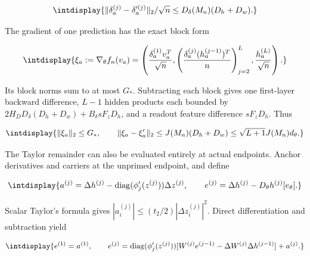\begingroup\renewcommand{\theHequation}{intdisplay.455}
\begin{equation*}
\intdisplay{
\|\delta_a^{(j)}-\delta_a'^{(j)}\|_2/\sqrt n
\le D_\delta(M_n)(D_h+D_w).
}
\end{equation*}
\endgroup


The gradient of one prediction has the exact block form


\begingroup\renewcommand{\theHequation}{intdisplay.456}
\begin{equation*}
\intdisplay{
\xi_a:=\nabla_\theta f_n(v_a)=
\left(\frac{\delta_a^{(1)}v_a^T}{\sqrt n},
\left(\frac{\delta_a^{(j)}(h_a^{(j-1)})^T}{n}\right)_{j=2}^L,
\frac{h_a^{(L)}}{\sqrt n}\right).
}
\end{equation*}
\endgroup


Its block norms sum to at most \(G_*\). Subtracting each block gives one first-layer backward difference, \(L-1\) hidden products each bounded by \(2H_DD_\delta(D_h+D_w)+B_\delta sF_zD_h\), and a readout feature difference \(sF_zD_h\). Thus


\begingroup\renewcommand{\theHequation}{intdisplay.457}
\begin{equation*}
\intdisplay{
\|\xi_a\|_2\le G_*,\qquad
\|\xi_a-\xi_a'\|_2
\le J(M_n)(D_h+D_w)
\le\sqrt{L+1}J(M_n)d_\theta.
}
\end{equation*}
\endgroup


The Taylor remainder can also be evaluated entirely at actual endpoints. Anchor derivatives and carriers at the unprimed endpoint, and define


\begingroup\renewcommand{\theHequation}{intdisplay.458}
\begin{equation*}
\intdisplay{
a^{(j)}=\Delta h^{(j)}-
\operatorname{diag}(\phi_j'(z^{(j)}))\Delta z^{(j)},\qquad
e^{(j)}=\Delta h^{(j)}-D_\theta h^{(j)}[e_\theta].
}
\end{equation*}
\endgroup


Scalar Taylor's formula gives \(|a_i^{(j)}|\le(t_2/2)|\Delta z_i^{(j)}|^2\). Direct differentiation and subtraction yield


\begingroup\renewcommand{\theHequation}{intdisplay.459}
\begin{equation*}
\intdisplay{
e^{(1)}=a^{(1)},\qquad
e^{(j)}=\operatorname{diag}(\phi_j'(z^{(j)}))
[W^{(j)}e^{(j-1)}-\Delta W^{(j)}\Delta h^{(j-1)}]+a^{(j)}.
}
\end{equation*}
\endgroup

